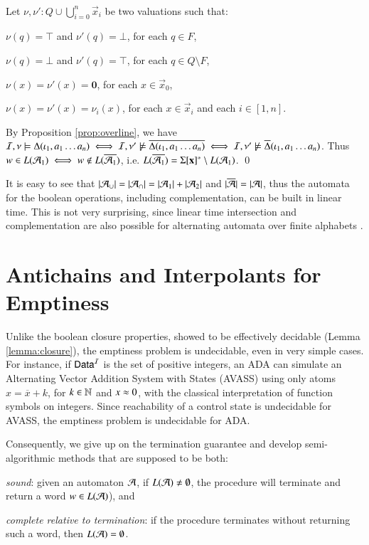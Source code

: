 \documentclass{llncs}
\begin{document}
{\[\begin{array}{rcll}
  \end{array}\]
  Let $\nu,\nu' : Q \cup \bigcup_{i=0}^n\vec{x}_i$ be two valuations
  such that: \begin{compactitem}
  \item $\nu(q) = \top$ and $\nu'(q) = \bot$, for each $q \in F$, 
  \item $\nu(q) = \bot$ and $\nu'(q) = \top$, for each $q \in Q \setminus F$, 
  \item $\nu(x) = \nu'(x) = \mathbf{0}$, for each $x \in \vec{x}_0$, 
  \item $\nu(x) = \nu'(x) = \nu_i(x)$, for each $x \in \vec{x}_i$ and each $i
    \in [1,n]$.
  \end{compactitem}
  By Proposition \ref{prop:overline}, we have $\mathcal{I},\nu \models
  \Delta(\iota_1,a_1 \ldots a_n) \iff \mathcal{I},\nu' \not\models
  \overline{\Delta(\iota_1,a_1 \ldots a_n)} \iff \mathcal{I},\nu' \not\models
  \overline{\Delta}(\iota_1,a_1 \ldots a_n)$. Thus $w \in L(\mathcal{A}_1) \iff
  w \not\in L(\overline{\mathcal{A}_1})$, i.e. $L(\overline{\mathcal{A}_1}) =
  \Sigma[\mathbf x]^* \setminus L(\mathcal{A}_1)$. \qed}

It is easy to see that ${|{\mathcal{A}_\cup}|} = {|{\mathcal{A}_\cap}|} = {|{\mathcal{A}_1}|} +
{|{\mathcal{A}_2}|}$ and ${|{\overline{\mathcal{A}}}|} = {|{\mathcal{A}}|}$, thus the automata
for the boolean operations, including complementation, can be built in
linear time. This is not very surprising, since linear time
intersection and complementation are also possible for alternating
automata over finite alphabets \cite{ChandraKozenStockmeyer81}.

\section{Antichains and Interpolants for Emptiness}

Unlike the boolean closure properties, showed to be effectively
decidable (Lemma \ref{lemma:closure}), the emptiness problem is
undecidable, even in very simple cases. For instance, if $\mathsf{Data}^{\mathcal{I}}$ is
the set of positive integers, an ADA can simulate an Alternating
Vector Addition System with States (AVASS) \cite{LazicSchmitz14} using
only atoms $x = \overline{x} + k$, for $k \in {\bf \mathbb{N}}$ and $x \approx 0$,
with the classical interpretation of function symbols on
integers. Since reachability of a control state is undecidable for
AVASS, the emptiness problem is undecidable for ADA.

Consequently, we give up on the termination guarantee and develop
semi-algorithmic methods that are supposed to be
both: \begin{compactenum}
\item \emph{sound}: given an automaton $\mathcal{A}$, if $L(\mathcal{A}) \neq\emptyset$,
  the procedure will terminate and return a word $w \in L(\mathcal{A})$), and
%
\item \emph{complete relative to termination}: if the procedure terminates
  without returning such a word, then $L(\mathcal{A}) = \emptyset$. 
\end{compactenum}
\end{document}
